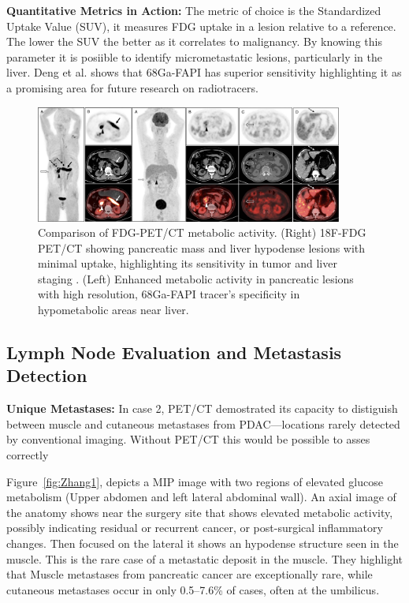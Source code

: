 \documentclass[11pt]{article} %
\begin{document}
\textbf{Quantitative Metrics in Action:} The metric of choice is the Standardized Uptake Value (SUV), it measures FDG uptake in a lesion relative to a reference. The lower the SUV the better as it correlates to malignancy. By knowing this parameter it is posiible to identify micrometastatic lesions, particularly in the liver. Deng et al. shows that 68Ga-FAPI has superior sensitivity highlighting it as a promising area for future research on radiotracers.\cite{Deng2021}


\begin{figure}[ht]
    \centering
    \includegraphics[width=0.9\textwidth]{assets/DengMerged.png}
    \caption{Comparison of FDG-PET/CT metabolic activity. (Right) 18F-FDG PET/CT showing pancreatic mass and liver hypodense lesions with minimal uptake, highlighting its sensitivity in tumor and liver staging \cite{Deng2021}. (Left) Enhanced metabolic activity in pancreatic lesions with high resolution, 68Ga-FAPI tracer’s specificity in hypometabolic areas near liver\cite{Deng2021}.}
    \label{fig:DengMerged}
\end{figure}


\subsection{Lymph Node Evaluation and Metastasis Detection}

\textbf{Unique Metastases:} 
In case 2, PET/CT demostrated its capacity to distiguish between muscle and cutaneous metastases from PDAC—locations rarely detected by conventional imaging. Without PET/CT this would be possible to asses correctly

Figure~\ref{fig:Zhang1}, depicts a MIP image with two regions of elevated glucose metabolism (Upper abdomen and left lateral abdominal wall). An axial image of the anatomy shows near the surgery site that shows elevated metabolic activity, possibly indicating residual or recurrent cancer, or post-surgical inflammatory changes. Then focused on the lateral it shows an hypodense structure seen in the muscle. This is the rare case of a metastatic deposit in the muscle. They highlight that Muscle metastases from pancreatic cancer are exceptionally rare, while cutaneous metastases occur in only 0.5–7.6\% of cases, often at the umbilicus\cite{Zhang2023}.
\end{document}
